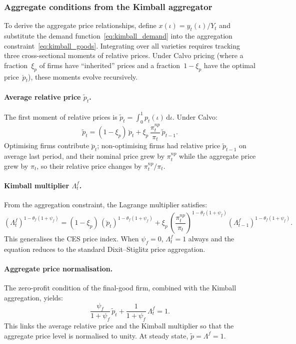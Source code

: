 \documentclass[11pt,a4paper]{article}
\newcommand{\dd}{\mathrm{d}}
\begin{document}
\subsubsection{Aggregate conditions from the Kimball aggregator}

To derive the aggregate price relationships, define $x(\iota) = y_t(\iota)/Y_t$
and substitute the demand function~\eqref{eq:kimball_demand} into the
aggregation constraint~\eqref{eq:kimball_goods}. Integrating over all
varieties requires tracking three cross-sectional moments of relative
prices. Under Calvo pricing (where a fraction~$\xi_p$ of firms have
``inherited'' prices and a fraction~$1-\xi_p$ have the optimal
price~$\breve p_t$), these moments evolve recursively.

\paragraph{Average relative price $\tilde p_t$.}
The first moment of relative prices is $\tilde p_t =
\int_0^1 p_t(\iota)\,\dd\iota$. Under Calvo:
\begin{equation}\label{eq:eq20}\tag{Eq.~20}
  \boxed{
  \tilde p_t = (1-\xi_p)\,\breve p_t
  + \xi_p\,\frac{\pi^{np}_t}{\pi_t}\,\tilde p_{t-1}.}
\end{equation}
Optimising firms contribute $\breve p_t$; non-optimising firms had relative
price $\tilde p_{t-1}$ on average last period, and their nominal price
grew by $\pi^{np}_t$ while the aggregate price grew by $\pi_t$, so their
relative price changes by $\pi^{np}_t/\pi_t$.

\paragraph{Kimball multiplier $\Lambda^f_t$.}
From the aggregation constraint, the Lagrange multiplier satisfies:
\begin{equation}\label{eq:eq16}\tag{Eq.~16}
  \boxed{
  (\Lambda^f_t)^{1-\theta_f(1+\psi_f)}
  = (1-\xi_p)\,(\breve p_t)^{1-\theta_f(1+\psi_f)}
  + \xi_p\,
    \left(\frac{\pi^{np}_t}{\pi_t}\right)^{\!1-\theta_f(1+\psi_f)}
    \!(\Lambda^f_{t-1})^{1-\theta_f(1+\psi_f)}.}
\end{equation}
This generalises the CES price index. When $\psi_f = 0$,
$\Lambda^f_t = 1$ always and the equation reduces to the standard
Dixit--Stiglitz price aggregation.

\paragraph{Aggregate price normalisation.}
The zero-profit condition of the final-good firm, combined with the
Kimball aggregation, yields:
\begin{equation}\label{eq:eq21}\tag{Eq.~21}
  \boxed{
  \frac{\psi_f}{1+\psi_f}\,\tilde p_t + \frac{1}{1+\psi_f}\,\Lambda^f_t = 1.}
\end{equation}
This links the average relative price and the Kimball multiplier so that
the aggregate price level is normalised to unity. At steady state,
$\tilde p = \Lambda^f = 1$.
\end{document}
